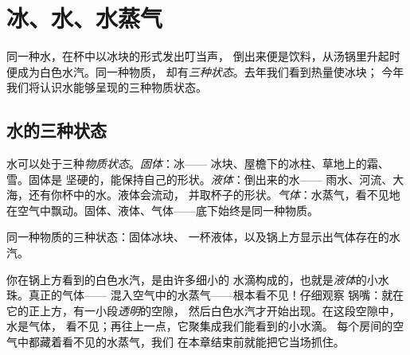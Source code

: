 \chapter{冰、水、水蒸气}\label{ch:g2:ice-water-steam}

同一种水，在杯中以冰块的形式发出叮当声，
倒出来便是饮料，从汤锅里升起时便成为白色水汽。同一种物质，
却有\emph{三种状态}。去年我们看到热量使冰块；
今年我们将认识水能够呈现的三种物质状态。

\section{水的三种状态}

\begin{example}[各种状态出现在哪里]\label{ex:g2:ice-water-steam:where}
水可以处于三种\emph{物质状态}。\emph{固体}：冰——
冰块、屋檐下的冰柱、草地上的霜、雪。固体是
坚硬的，能保持自己的形状。\emph{液体}：倒出来的水——
雨水、河流、大海，还有你杯中的水。液体会流动，
并取杯子的形状。\emph{气体}：水蒸气，看不见地
在空气中飘动。固体、液体、气体——底下始终是同一种物质。
\end{example}

\begin{omfigure}

{\small 同一种物质的三种状态：固体冰块、
一杯液体，以及锅上方显示出气体存在的水汽。}
\end{omfigure}

\begin{remark}[水蒸气是看不见的]\label{rem:g2:ice-water-steam:invisible}
你在锅上方看到的白色水汽，是由许多细小的
水滴构成的，也就是\emph{液体}的小水珠。真正的气体——
混入空气中的水蒸气——根本看不见！仔细观察
锅嘴：就在它的正上方，有一小段\emph{透明}的空隙，
然后白色水汽才开始出现。在这段空隙中，水是气体，
看不见；再往上一点，它聚集成我们能看到的小水滴。
每个房间的空气中都藏着看不见的水蒸气，我们
在本章结束前就能把它当场抓住。
\end{remark}

